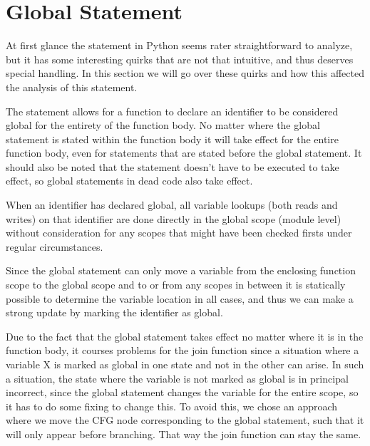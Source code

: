 \chapter{Global Statement}
At first glance the  statement in Python seems rater straightforward to analyze, but it has some interesting quirks that are not that intuitive, 
and thus deserves special handling. In this section we will go over these quirks and how this affected the analysis of this statement.

The statement allows for a function to declare an identifier to be considered global for the entirety of the function body. 
No matter where the global statement is stated within the function body it will take effect for the entire function body, 
even for statements that are stated before the global statement. It should also be noted that the statement doesn't 
have to be executed to take effect, so global statements in dead code also take effect.

When an identifier has declared global, all variable lookups (both reads and writes) on that identifier are done directly in the global scope (module level) 
without consideration for any scopes that might have been checked firsts under regular circumstances.

Since the global statement can only move a variable from the enclosing function scope to the global scope and to or from any scopes in between 
it is statically possible to determine the variable location in all cases, and thus we can make a strong update by marking the identifier as global. 

Due to the fact that the global statement takes effect no matter where it is in the function body, it courses problems for the join function 
since a situation where a variable X is marked as global in one state and not in the other can arise. In such a situation, the state where the variable is not marked as global is in principal incorrect, since the global statement changes the variable for the entire scope, so it has to do some fixing to change this. To avoid this, we chose an approach where we move the CFG node corresponding to the global statement, such that it will only appear before branching. That way the join function can stay the same.

